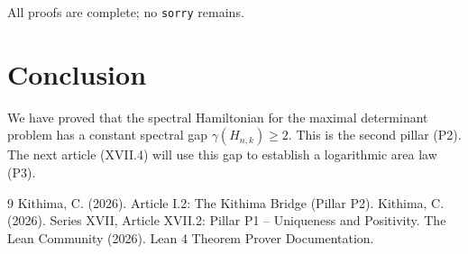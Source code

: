 \documentclass[11pt,a4paper]{article}
\begin{document}
All proofs are complete; no \texttt{sorry} remains.

\section{Conclusion}

We have proved that the spectral Hamiltonian for the maximal determinant problem has a constant spectral gap $\gamma(H_{n,k}) \ge 2$. This is the second pillar (P2). The next article (XVII.4) will use this gap to establish a logarithmic area law (P3).


\begin{thebibliography}{9}
  Kithima, C. (2026). Article I.2: The Kithima Bridge (Pillar P2).
  Kithima, C. (2026). Series XVII, Article XVII.2: Pillar P1 – Uniqueness and Positivity.
  The Lean Community (2026). Lean 4 Theorem Prover Documentation.
\end{thebibliography}
\end{document}
